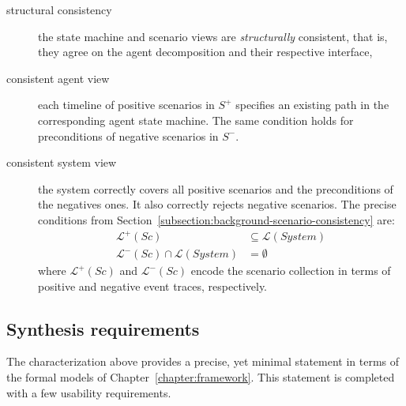 \begin{description}
\item[structural consistency] the state machine and scenario views are \emph{structurally} consistent, that is, they agree on the agent decomposition and their respective interface,

\item[consistent agent view] each timeline of positive scenarios in $S^+$ specifies an existing path in the corresponding agent state machine. The same condition holds for preconditions of negative scenarios in $S^-$.

\item[consistent system view] the system correctly covers all positive scenarios and the preconditions of the negatives ones. It also correctly rejects negative scenarios. The precise conditions from Section~\ref{subsection:background-scenario-consistency} are:
\begin{align}
\mathcal{L}^+(Sc) & \subseteq \mathcal{L}(System) \\
\mathcal{L}^-(Sc) \cap \mathcal{L}(System) &= \emptyset
\label{relation:inductive-statement-negative}
\end{align}
\noindent where $\mathcal{L}^+(Sc)$ and $\mathcal{L}^-(Sc)$ encode the scenario collection in terms of positive and negative event traces, respectively.

\end{description}


\subsection{Synthesis requirements\label{subsection:inductive-synthesis-requirements}}

The characterization above provides a precise, yet minimal statement in terms of the formal models of Chapter~\ref{chapter:framework}. This statement is completed with a few usability requirements.


